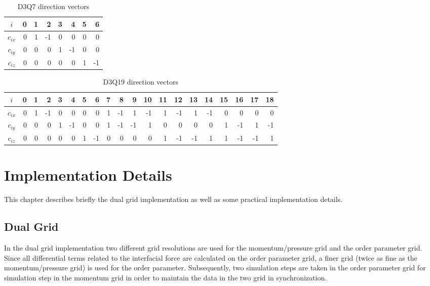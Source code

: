\documentclass[12pt]{report}
\begin{document}
\setlength{\tabcolsep}{4pt}
\begin{table}[h]\footnotesize
  \centering
\begin{tabular}{|c|r|r|r|r|r|r|r|}\hline
  $i$      & 0 & 1 &  2 & 3 &  4 & 5 &  6\\\hline\hline
  $c_{ix}$ & 0 & 1 & -1 & 0 &  0 & 0 &  0\\
  $c_{iy}$ & 0 & 0 &  0 & 1 & -1 & 0 &  0\\
  $c_{iz}$ & 0 & 0 &  0 & 0 &  0 & 1 & -1\\\hline
\end{tabular}
 \caption{D3Q7 direction vectors}
\end{table}

\setlength{\tabcolsep}{4pt}
\begin{table}[h]\footnotesize
  \centering
\begin{tabular}{|c|r|r|r|r|r|r|r|r|r|r|r|r|r|r|r|r|r|r|r|}\hline
  $i$      & 0 & 1 &  2 & 3 &  4 & 5 &  6 & 7 &  8 &  9 & 10 & 11 & 12 & 13 & 14 & 15 & 16 & 17 & 18 \\\hline\hline
  $c_{ix}$ & 0 & 1 & -1 & 0 &  0 & 0 &  0 & 1 & -1 &  1 & -1 &  1 & -1 &  1 & -1 &  0 &  0 &  0 &  0 \\
  $c_{iy}$ & 0 & 0 &  0 & 1 & -1 & 0 &  0 & 1 & -1 & -1 &  1 &  0 &  0 &  0 &  0 &  1 & -1 &  1 & -1 \\
  $c_{iz}$ & 0 & 0 &  0 & 0 &  0 & 1 & -1 & 0 &  0 &  0 &  0 &  1 & -1 & -1 &  1 &  1 & -1 & -1 &  1 \\\hline
\end{tabular}
 \caption{D3Q19 direction vectors}
\end{table}

\chapter{Implementation Details}
This chapter describes briefly the dual grid implementation as well as some practical implementation details.

\section{Dual Grid}
In the dual grid implementation two different grid resolutions are used for the momentum/pressure grid and the order parameter grid. Since all differential terms related to the interfacial force are calculated on the order parameter grid, a finer grid (twice as fine as the momentum/pressure grid) is used for the order parameter. Subsequently, two simulation steps are taken in the order parameter grid for simulation step in the momentum grid in order to maintain the data in the two grid in synchronization.
\end{document}
